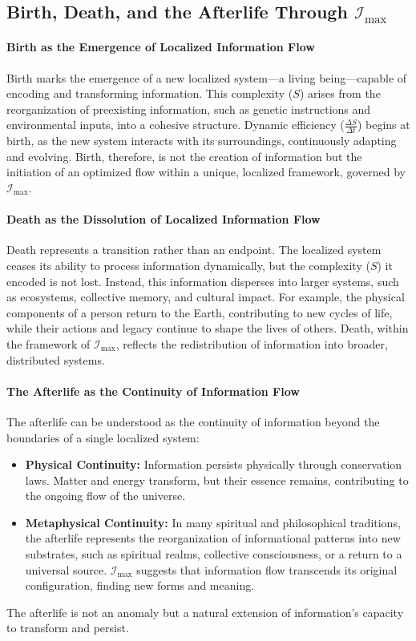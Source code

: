\documentclass[12pt]{article}
\begin{document}
\subsection{Birth, Death, and the Afterlife Through \(\mathcal{I}_{\text{max}}\)}

\paragraph{Birth as the Emergence of Localized Information Flow}
Birth marks the emergence of a new localized system—a living being—capable of encoding and transforming information. This complexity (\(S\)) arises from the reorganization of preexisting information, such as genetic instructions and environmental inputs, into a cohesive structure. Dynamic efficiency (\(\frac{\Delta S}{\Delta t}\)) begins at birth, as the new system interacts with its surroundings, continuously adapting and evolving. Birth, therefore, is not the creation of information but the initiation of an optimized flow within a unique, localized framework, governed by \(\mathcal{I}_{\text{max}}\).

\paragraph{Death as the Dissolution of Localized Information Flow}
Death represents a transition rather than an endpoint. The localized system ceases its ability to process information dynamically, but the complexity (\(S\)) it encoded is not lost. Instead, this information disperses into larger systems, such as ecosystems, collective memory, and cultural impact. For example, the physical components of a person return to the Earth, contributing to new cycles of life, while their actions and legacy continue to shape the lives of others. Death, within the framework of \(\mathcal{I}_{\text{max}}\), reflects the redistribution of information into broader, distributed systems.

\paragraph{The Afterlife as the Continuity of Information Flow}
The afterlife can be understood as the continuity of information beyond the boundaries of a single localized system:
\begin{itemize}
    \item \textbf{Physical Continuity:} Information persists physically through conservation laws. Matter and energy transform, but their essence remains, contributing to the ongoing flow of the universe.
    \item \textbf{Metaphysical Continuity:} In many spiritual and philosophical traditions, the afterlife represents the reorganization of informational patterns into new substrates, such as spiritual realms, collective consciousness, or a return to a universal source. \(\mathcal{I}_{\text{max}}\) suggests that information flow transcends its original configuration, finding new forms and meaning.
\end{itemize}
The afterlife is not an anomaly but a natural extension of information’s capacity to transform and persist.
\end{document}
